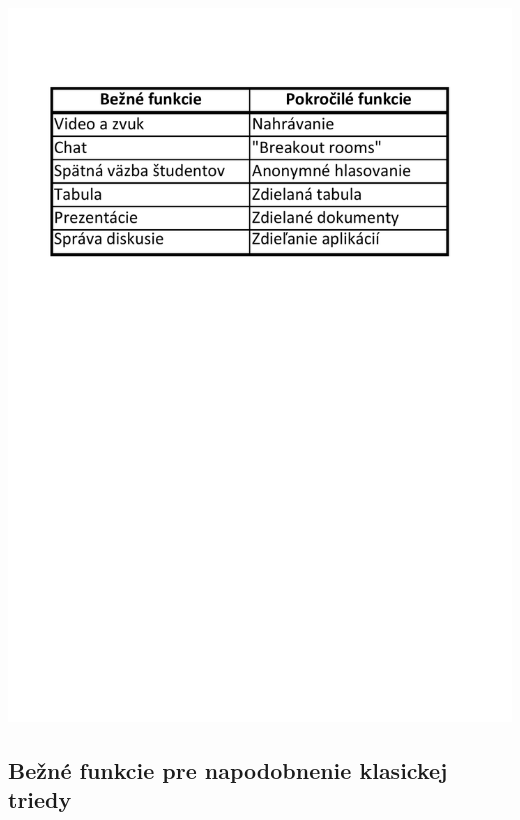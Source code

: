 \documentclass[10pt,twoside,slovak,a4paper]{article}
\begin{document}
\includegraphics[width=\textwidth, trim = 0cm 15cm 0cm 2cm, clip]{tab1.pdf}\label{tab}



\subsection{Bežné funkcie pre napodobnenie klasickej triedy} \label{Bezne}
\end{document}
